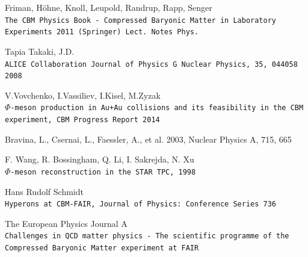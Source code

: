 \documentclass[a4paper,12pt]{article}
\begin{document}
\begin{thebibliography}{9}
	Friman, Höhne, Knoll, Leupold, Randrup, Rapp, Senger
	\\\texttt{The CBM Physics Book - Compressed Baryonic Matter in Laboratory Experiments 2011 (Springer) Lect. Notes Phys.}
				
	 Tapia Takaki, J.D.
	 \\\texttt{ALICE Collaboration Journal of Physics G Nuclear Physics, 35, 044058 2008}
				
	 V.Vovchenko, I.Vassiliev, I.Kisel, M.Zyzak
	 \\\texttt{$\Phi$-meson production in Au+Au collisions and its feasibility in the CBM experiment, CBM Progress Report 2014}
				
	Bravina, L., Csernai, L., Faessler, A., et al. 2003, Nuclear Physics A, 715, 665 
				
	F. Wang, R. Bossingham, Q. Li, I. Sakrejda,  N. Xu 
	\\\texttt{$\Phi$-meson reconstruction in the STAR TPC, 1998}
				
	Hans Rudolf Schmidt
	\\\texttt{Hyperons at CBM-FAIR, Journal of Physics: Conference Series 736}
	
	The European Physics Journal A
	\\\texttt{Challenges in QCD matter physics - The scientific programme of the Compressed Baryonic Matter experiment at FAIR}
\end{thebibliography}
\end{document}
